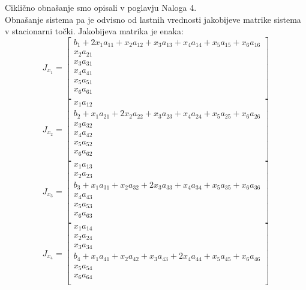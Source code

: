 \documentclass[a4paper, 12pt]{article}
\begin{document}
Ciklično obnašanje smo opisali v poglavju Naloga 4.\\
Obnašanje sistema pa je odvisno od lastnih vrednosti jakobijeve matrike sistema
v stacionarni točki. Jakobijeva matrika je enaka:
\begin{equation}
	J_{x_{1}} =
	\begin{bmatrix}
		b_{1}+2x_{1}a_{11}+x_{2}a_{12}+x_{3}a_{13}+x_{4}a_{14}+x_{5}a_{15}+x_{6}a_{16} \\
		x_{2}a_{21} \\
		x_{3}a_{31} \\
		x_{4}a_{41} \\
		x_{5}a_{51} \\
		x_{6}a_{61} \\
	\end{bmatrix}
\end{equation}
\begin{equation}
	J_{x_{2}} =
	\begin{bmatrix}
		x_{1}a_{12} \\
		b_{2}+x_{1}a_{21}+2x_{2}a_{22}+x_{3}a_{23}+x_{4}a_{24}+x_{5}a_{25}+x_{6}a_{26} \\
		x_{3}a_{32} \\
		x_{4}a_{42} \\
		x_{5}a_{52} \\
		x_{6}a_{62} \\
	\end{bmatrix}
\end{equation}
\begin{equation}
	J_{x_{3}} =
	\begin{bmatrix}
		x_{1}a_{13} \\
		x_{2}a_{23} \\
		b_{3}+x_{1}a_{31}+x_{2}a_{32}+2x_{3}a_{33}+x_{4}a_{34}+x_{5}a_{35}+x_{6}a_{36} \\
		x_{4}a_{43} \\
		x_{5}a_{53} \\
		x_{6}a_{63} \\
	\end{bmatrix}
\end{equation}
\begin{equation}
	J_{x_{4}} =
	\begin{bmatrix}
		x_{1}a_{14} \\
		x_{2}a_{24} \\
		x_{3}a_{34} \\
		b_{4}+x_{1}a_{41}+x_{2}a_{42}+x_{3}a_{43}+2x_{4}a_{44}+x_{5}a_{45}+x_{6}a_{46} \\
		x_{5}a_{54} \\
		x_{6}a_{64} \\
	\end{bmatrix}
\end{equation}
\end{document}
